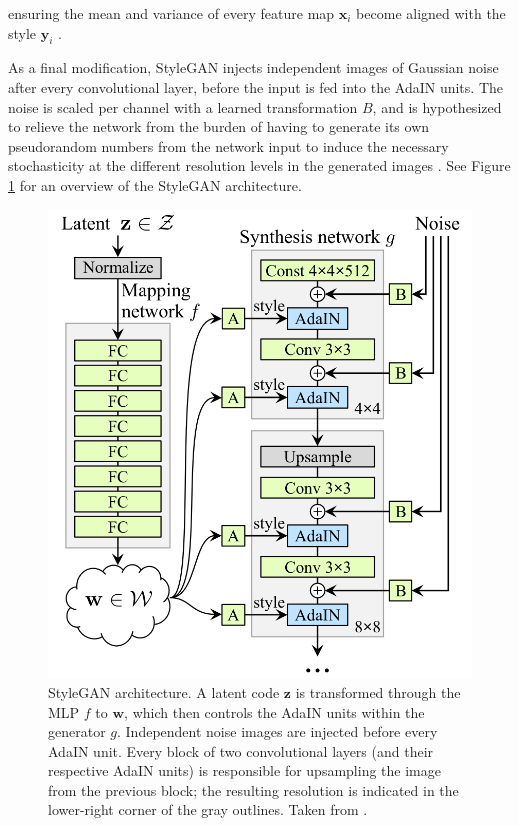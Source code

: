 \documentclass{article}
\begin{document}
\noindent
ensuring the mean and variance of every feature map $\mathbf{x}_i$ become aligned with the style $\mathbf{y}_i$ \cite{huang2017arbitrary, karras2019stylebased}.

As a final modification, StyleGAN injects independent images of Gaussian noise after every convolutional layer, before the input is fed into the AdaIN units. The noise is scaled per channel with a learned transformation $B$, and is hypothesized to relieve the network from the burden of having to generate its own pseudorandom numbers from the network input to induce the necessary stochasticity at the different resolution levels in the generated images \cite{karras2019stylebased}. See Figure \ref{fig:stylegan_architecture} for an overview of the StyleGAN architecture.

\begin{figure}
    \centering
    \includegraphics[width=\linewidth]{report/img/stylegan_architecture.png}
    \caption{StyleGAN architecture. A latent code $\mathbf{z}$ is transformed through the MLP $f$ to $\mathbf{w}$, which then controls the AdaIN units within the generator $g$. Independent noise images are injected before every AdaIN unit. Every block of two convolutional layers (and their respective AdaIN units) is responsible for upsampling the image from the previous block; the resulting resolution is indicated in the lower-right corner of the gray outlines. Taken from \cite{karras2019stylebased}.}
    \label{fig:stylegan_architecture}
\end{figure}
\end{document}
